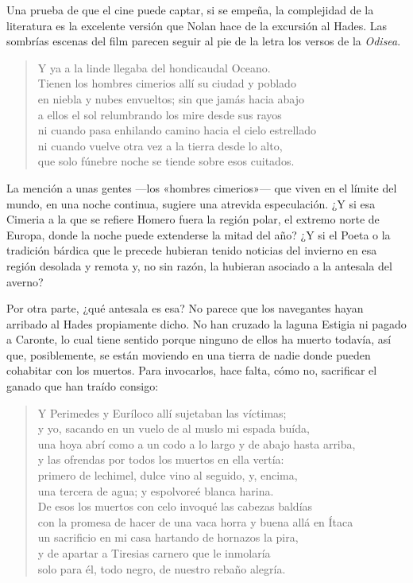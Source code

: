 
Una prueba de que el cine puede captar, si se empeña, la complejidad de la literatura es la excelente versión que Nolan hace de la excursión al Hades. Las sombrías escenas del film parecen seguir al pie de la letra los versos de la \emph{Odisea}.

\begin{verse}
Y ya a la linde llegaba del hondicaudal Oceano.\\
Tienen los hombres cimerios allí su ciudad y poblado\\
en niebla y nubes envueltos; sin que jamás hacia abajo\\
a ellos el sol relumbrando los mire desde sus rayos\\
ni cuando pasa enhilando camino hacia el cielo estrellado\\
ni cuando vuelve otra vez a la tierra desde lo alto,\\
que solo fúnebre noche se tiende sobre esos cuitados.
\end{verse}

La mención a unas gentes ---los «hombres cimerios»--- que viven en el límite del mundo, en una noche continua, sugiere una atrevida especulación. ¿Y si esa Cimeria a la que se refiere Homero fuera la región polar, el extremo norte de Europa, donde la noche puede extenderse la mitad del año? ¿Y si el Poeta o la tradición bárdica que le precede hubieran tenido noticias del invierno en esa región desolada y remota y, no sin razón, la hubieran asociado a la antesala del averno?

Por otra parte, ¿qué antesala es esa? No parece que los navegantes hayan arribado al Hades propiamente dicho. No han cruzado la laguna Estigia ni pagado a Caronte, lo cual tiene sentido porque ninguno de ellos ha muerto todavía, así que, posiblemente, se están moviendo en una tierra de nadie donde pueden cohabitar con los muertos. Para invocarlos, hace falta, cómo no, sacrificar el ganado que han traído consigo:

\begin{verse}
Y Perimedes y Euríloco allí sujetaban las víctimas;\\
y yo, sacando en un vuelo de al muslo mi espada buída,\\
una hoya abrí como a un codo a lo largo y de abajo hasta arriba,\\
y las ofrendas por todos los muertos en ella vertía:\\
primero de lechimel, dulce vino al seguido, y, encima,\\
una tercera de agua; y espolvoreé blanca harina.\\
De esos los muertos con celo invoqué las cabezas baldías\\
con la promesa de hacer de una vaca horra y buena allá en Ítaca\\
un sacrificio en mi casa hartando de hornazos la pira,\\
y de apartar a Tiresias carnero que le inmolaría\\
solo para él, todo negro, de nuestro rebaño alegría.
\end{verse}

